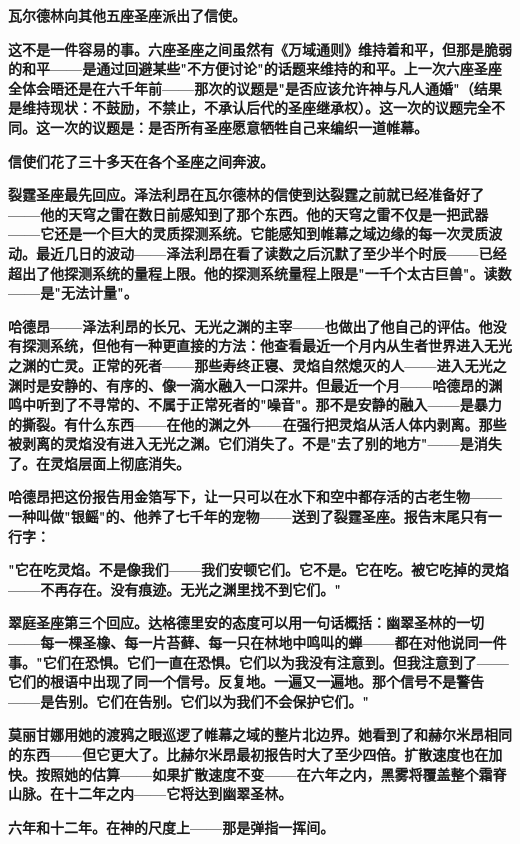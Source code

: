 \documentclass[12pt,a4paper,openany]{ctexbook}
\begin{document}
\textbf{瓦尔德林向其他五座圣座派出了信使。}


\textbf{这不是一件容易的事。六座圣座之间虽然有《万域通则》维持着和平，但那是脆弱的和平——是通过回避某些"不方便讨论"的话题来维持的和平。上一次六座圣座全体会晤还是在六千年前——那次的议题是"是否应该允许神与凡人通婚"（结果是维持现状：不鼓励，不禁止，不承认后代的圣座继承权）。这一次的议题完全不同。这一次的议题是：是否所有圣座愿意牺牲自己来编织一道帷幕。}


\textbf{信使们花了三十多天在各个圣座之间奔波。}


\textbf{裂霆圣座最先回应。泽法利昂在瓦尔德林的信使到达裂霆之前就已经准备好了——他的天穹之雷在数日前感知到了那个东西。他的天穹之雷不仅是一把武器——它还是一个巨大的灵质探测系统。它能感知到帷幕之域边缘的每一次灵质波动。最近几日的波动——泽法利昂在看了读数之后沉默了至少半个时辰——已经超出了他探测系统的量程上限。他的探测系统量程上限是"一千个太古巨兽"。读数——是"无法计量"。}


\textbf{哈德昂——泽法利昂的长兄、无光之渊的主宰——也做出了他自己的评估。他没有探测系统，但他有一种更直接的方法：他查看最近一个月内从生者世界进入无光之渊的亡灵。正常的死者——那些寿终正寝、灵焰自然熄灭的人——进入无光之渊时是安静的、有序的、像一滴水融入一口深井。但最近一个月——哈德昂的渊鸣中听到了不寻常的、不属于正常死者的"噪音"。那不是安静的融入——是暴力的撕裂。有什么东西——在他的渊之外——在强行把灵焰从活人体内剥离。那些被剥离的灵焰没有进入无光之渊。它们消失了。不是"去了别的地方"——是消失了。在灵焰层面上彻底消失。}


\textbf{哈德昂把这份报告用金箔写下，让一只可以在水下和空中都存活的古老生物——一种叫做"银鳐"的、他养了七千年的宠物——送到了裂霆圣座。报告末尾只有一行字：}


\textbf{"它在吃灵焰。不是像我们——我们安顿它们。它不是。它在吃。被它吃掉的灵焰——不再存在。没有痕迹。无光之渊里找不到它们。"}


\textbf{翠庭圣座第三个回应。达格德里安的态度可以用一句话概括：幽翠圣林的一切——每一棵圣橡、每一片苔藓、每一只在林地中鸣叫的蝉——都在对他说同一件事。"它们在恐惧。它们一直在恐惧。它们以为我没有注意到。但我注意到了——它们的根语中出现了同一个信号。反复地。一遍又一遍地。那个信号不是警告——是告别。它们在告别。它们以为我们不会保护它们。"}


\textbf{莫丽甘娜用她的渡鸦之眼巡逻了帷幕之域的整片北边界。她看到了和赫尔米昂相同的东西——但它更大了。比赫尔米昂最初报告时大了至少四倍。扩散速度也在加快。按照她的估算——如果扩散速度不变——在六年之内，黑雾将覆盖整个霜脊山脉。在十二年之内——它将达到幽翠圣林。}


\textbf{六年和十二年。在神的尺度上——那是弹指一挥间。}
\end{document}
